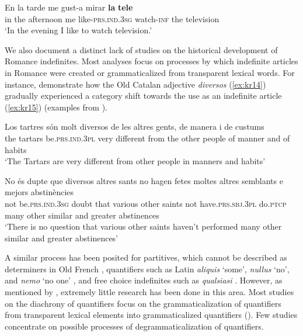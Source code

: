 \documentclass[output=paper,colorlinks,citecolor=brown]{langscibook}
\begin{document}
\ea\label{ex:kr13} 
\gll En la tarde me gust-a mirar \textbf{la} \textbf{tele}\\
     in the afternoon me like-\textsc{prs.ind.3sg} watch-\textsc{inf} the television\\
\glt ‘In the evening I like to watch television.’\\
\z

We also document a distinct lack of studies on the historical development of Romance indefinites. Most analyses focus on processes by which indefinite articles in Romance were created or grammaticalized from transparent lexical words. For instance, \citet{BergarechePérez-Saldanya2011} demonstrate how the Old Catalan adjective \textit{diversos} (\ref{ex:kr14}) gradually experienced a category shift towards the use as an indefinite article (\ref{ex:kr15}) (examples from \citealt{BergarechePérez-Saldanya2011}). 

\ea\label{ex:kr14} 
\gll Los tartres són molt diversos de les altres gents, de manera i de custums\\
     the tartars be.\textsc{prs.ind.3pl} very different from the other people of manner and of habits\\
\glt ‘The Tartars are very different from other people in manners and habits’\\
\z

\ea\label{ex:kr15} 
\gll No és dupte que diversos altres sants no hagen fetes moltes altres semblants e mejors abstinències\\
     not be.\textsc{prs.ind.3sg} doubt that various other saints not have.\textsc{prs.sbj.3pl} do.\textsc{ptcp} many other similar and greater abstinences\\
\glt ‘There is no question that various other saints haven't performed many other similar and greater abstinences’\\
\z

A similar process has been posited for partitives, which cannot be described as determiners in Old French \citep{Carlier2013}, quantifiers such as Latin \textit{aliquis} ‘some’, \textit{nullus} ‘no’, and \textit{nemo} ‘no one’ \citep{Gianollo2018}, and free choice indefinites such as \textit{qualsiasi} \citep{DeganoAloni2021}. However, as mentioned by \citet[2]{DeganoAloni2021}, extremely little research has been done in this area. Most studies on the diachrony of quantifiers focus on the grammaticalization of quantifiers from transparent lexical elements into grammaticalized quantifiers (\citealt{Haspelmath1997, Verveckken2015, Gianollo2018, CompanyCompanyPozasLoyo2009}). Few studies concentrate on possible processes of degrammaticalization of quantifiers. 
\end{document}
